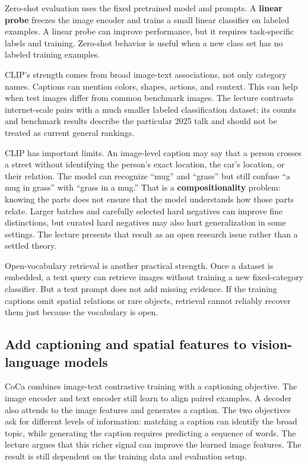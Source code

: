Zero-shot evaluation uses the fixed pretrained model and prompts. A \textbf{linear probe} freezes the image encoder and trains a small linear classifier on labeled examples. A linear probe can improve performance, but it requires task-specific labels and training. Zero-shot behavior is useful when a new class set has no labeled training examples.

CLIP's strength comes from broad image-text associations, not only category names. Captions can mention colors, shapes, actions, and context. This can help when test images differ from common benchmark images. The lecture contrasts internet-scale pairs with a much smaller labeled classification dataset; its counts and benchmark results describe the particular 2025 talk and should not be treated as current general rankings.

CLIP has important limits. An image-level caption may say that a person crosses a street without identifying the person's exact location, the car's location, or their relation. The model can recognize ``mug'' and ``grass'' but still confuse ``a mug in grass'' with ``grass in a mug.'' That is a \textbf{compositionality} problem: knowing the parts does not ensure that the model understands how those parts relate. Larger batches and carefully selected hard negatives can improve fine distinctions, but curated hard negatives may also hurt generalization in some settings. The lecture presents that result as an open research issue rather than a settled theory.

Open-vocabulary retrieval is another practical strength. Once a dataset is embedded, a text query can retrieve images without training a new fixed-category classifier. But a text prompt does not add missing evidence. If the training captions omit spatial relations or rare objects, retrieval cannot reliably recover them just because the vocabulary is open.

\subsection{Add captioning and spatial features to vision-language models}\label{04-visual-computing-ii-ch031-add-captioning-and-spatial-features-to-vision-language-models}

CoCa combines image-text contrastive training with a captioning objective. The image encoder and text encoder still learn to align paired examples. A decoder also attends to the image features and generates a caption. The two objectives ask for different levels of information: matching a caption can identify the broad topic, while generating the caption requires predicting a sequence of words. The lecture argues that this richer signal can improve the learned image features. The result is still dependent on the training data and evaluation setup.


